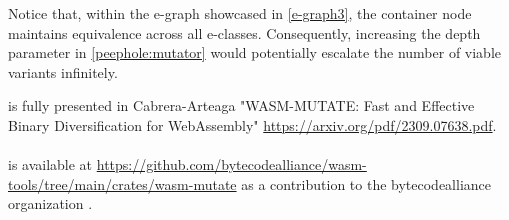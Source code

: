 Notice that, within the e-graph showcased in \autoref{e-graph3}, the container node maintains equivalence across all e-classes. 
Consequently, increasing the depth parameter in \autoref{peephole:mutator} would potentially escalate the number of viable variants infinitely.



\begin{tcolorbox}[title=Contribution paper and artifact,boxrule=1pt,arc=.2em,boxsep=1.0mm]
  \tool is fully presented in Cabrera-Arteaga \etal "WASM-MUTATE: Fast and Effective Binary Diversification for WebAssembly"
 \url{https://arxiv.org/pdf/2309.07638.pdf}.
  \\\\
  \tool is available at \url{https://github.com/bytecodealliance/wasm-tools/tree/main/crates/wasm-mutate} as a contribution to the bytecodealliance organization .
\end{tcolorbox}